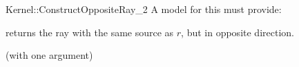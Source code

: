 \begin{ccRefFunctionObjectConcept}{Kernel::ConstructOppositeRay_2}
A model for this must provide:


{returns the ray with the same source as $r$, but in opposite direction.}

\ccRefines
{} (with one argument)

\ccSeeAlso
{} \\

\end{ccRefFunctionObjectConcept}
